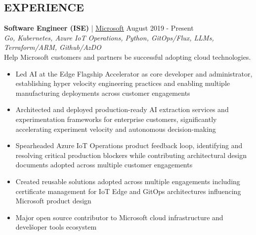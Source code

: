 \documentclass[margin, 10pt, hidelinks]{res} %
\newcommand{\emphasize}{\bf} %
\begin{document}
\begin{resume}






    \section{EXPERIENCE}

     {\emphasize Software Engineer (ISE)} | \href{https://www.microsoft.com/}{\underline{Microsoft}}    \hfill August 2019 - Present  \\
    {\it Go, Kubernetes, Azure IoT Operations, Python, GitOps/Flux, LLMs, Terraform/ARM, Github/AzDO} \\ %
    Help Microsoft customers and partners be successful adopting cloud technologies.
    \begin{itemize} \setlength{\itemindent}{-0.1in}\itemsep 0pt %
        \item Led AI at the Edge Flagship Accelerator as core developer and administrator, establishing hyper velocity engineering practices and enabling multiple manufacturing deployments across customer engagements
        \item Architected and deployed production-ready AI extraction services and experimentation frameworks for enterprise customers, significantly accelerating experiment velocity and autonomous decision-making
        \item Spearheaded Azure IoT Operations product feedback loop, identifying and resolving critical production blockers while contributing architectural design documents adopted across multiple customer engagements
        \item Created reusable solutions adopted across multiple engagements including certificate management for IoT Edge and GitOps architectures influencing Microsoft product design
        \item Major open source contributor to Microsoft cloud infrastructure and develšoper tools ecosystem
    \end{itemize}


\end{resume}
\end{document}
